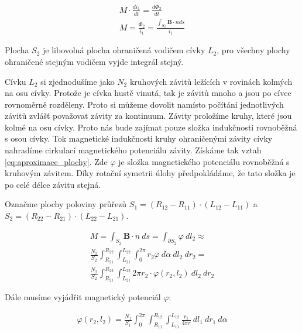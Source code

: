 \documentclass{book}
\newcommand{\vect}[1]{\boldsymbol{#1}}
\begin{document}
\begin{equation}
\label{eq:vypocet_m_obecne}
\begin{split}
M \cdot \frac{di_1}{dt} = \frac{d\Phi_2}{dt} \\
M = \frac{\Phi_2}{i_1} = \frac{\int_{S_2} \vect{B} \cdot {n} ds}{i_1}
\end{split}
\end{equation}

Plocha \(S_2\) je libovolná plocha ohraničená vodičem cívky \(L_2\), pro všechny plochy ohraničené stejným vodičem vyjde integrál stejný.

Cívku \(L_2\) si zjednodušíme jako \(N_2\) kruhových závitů ležících v rovinách kolmých na osu cívky. Protože je cívka hustě vinutá, tak je závitů mnoho a jsou po cívce rovnoměrně rozděleny. Proto si můžeme dovolit namísto počítání jednotlivých závitů zvlášť považovat závity za kontinuum. Závity proložíme kruhy, které jsou kolmé na osu cívky. Proto nás bude zajímat pouze složka indukčnosti rovnoběžná s osou cívky. Tok magnetické indukčnosti kruhy ohraničenými závity cívky nahradíme cirkulací magnetického potenciálu závity. Získáme tak vztah \eqref{eq:aproximace_plochy}. Zde \(\varphi\) je složka magnetického potenciálu rovnoběžná s kruhovým závitem. Díky rotační symetrii úlohy předpokládáme, že tato složka je po celé délce závitu stejná.

Označme plochy poloviny průřezů \(S_1 = (R_{12} - R_{11}) \cdot (L_{12} - L_{11})\) a \(S_2 = (R_{22} - R_{21}) \cdot (L_{22} - L_{21})\).

\begin{equation}
\label{eq:aproximace_plochy}
\begin{split}
M = \int_{S_2} \vect{B} \cdot {n} \ ds = \int_{\partial S_2} \varphi \ dl_2 \approx \\
\frac{N_2}{S_2} \int_{R_{21}}^{R_{22}} \int_{L_{21}}^{L_{22}} \int_{0}^{2 \pi} r_2 \varphi \ d\alpha \ dl_2 \ dr_2 = \\
\frac{N_2}{S_2} \int_{R_{21}}^{R_{22}} \int_{L_{21}}^{L_{22}} 2 \pi r_2 \cdot \varphi(r_2, l_2) \ dl_2 \ dr_2 
\end{split}
\end{equation}

Dále musíme vyjádřit magnetický potenciál \(\varphi\):

\begin{equation}
\label{eq:civky_potencial}
\begin{split}
\varphi(r_2, l_2) = \frac{N_1}{S_1} \int_{0}^{2 \pi} \int_{R_{11}}^{R_{12}} \int_{L_{11}}^{L_{12}} \frac{r_1}{4 \pi r}  \ dl_1 \ dr_1 \ d \alpha
\end{split}
\end{equation}
\end{document}
